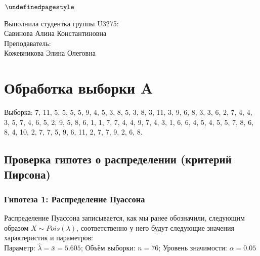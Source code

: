 \documentclass[12pt]{article}
\begin{document}
\pagestyle{fancy}
$\thispagestyle{first style}$


\vspace{25mm}


\vspace{50mm}

\begin{flushright}
Выполнила студентка группы U3275:\\Савинова Алина Константиновна\\
\vspace{5mm}
Преподаватель:\\Кожевникова Элина Олеговна\\
\end{flushright}

\newpage

\pagestyle{empty}
\raggedright

\section{Обработка выборки A}

Выборка: 7, 11, 5, 5, 5, 5, 9, 4, 5, 3, 8, 5, 3, 8, 3,
11, 3, 9, 6, 8, 3, 3, 6, 2, 7, 4, 4, 3, 5, 7,
4, 6, 5, 2, 9, 5, 8, 6, 1, 1, 7, 7, 4, 4, 9,
7, 4, 3, 1, 6, 6, 4, 5, 4, 5, 5, 7, 8, 6, 8,
4, 10, 2, 7, 7, 5, 9, 6, 11, 2, 7, 7, 9, 2, 6, 8.

\subsection{Проверка гипотез о распределении (критерий Пирсона)}

\subsubsection*{Гипотеза 1: Распределение Пуассона}
Распределение Пуассона записывается, как мы ранее обозначили, следующим образом $X \sim Pois(\lambda)$, соответственно у него будут следующие значения характеристик и параметров:\\
Параметр: $\hat{\lambda} = \bar{x} = 5.605$; Объём выборки: $n = 76$; Уровень значимости: $\alpha = 0.05$\\
\end{document}
